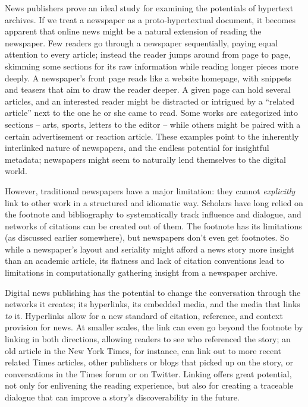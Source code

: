 News publishers prove an ideal study for examining the potentials of hypertext archives. If we treat a newspaper as a proto-hypertextual document, it becomes apparent that online news might be a natural extension of reading the newspaper. Few readers go through a newspaper sequentially, paying equal attention to every article; instead the reader jumps around from page to page, skimming some sections for its raw information while reading longer pieces more deeply. A newspaper's front page reads like a website homepage, with snippets and teasers that aim to draw the reader deeper. A given page can hold several articles, and an interested reader might be distracted or intrigued by a ``related article'' next to the one he or she came to read. Some works are categorized into sections -- arts, sports, letters to the editor -- while others might be paired with a certain advertisement or reaction article. These examples point to the inherently interlinked nature of newspapers, and the endless potential for insightful metadata; newspapers might seem to naturally lend themselves to the digital world.

However, traditional newspapers have a major limitation: they cannot \emph{explicitly} link to other work in a structured and idiomatic way. Scholars have long relied on the footnote and bibliography to systematically track influence and dialogue, and networks of citations can be created out of them. The footnote has its limitations (as discussed earlier somewhere), %
but newspapers don't even get footnotes. So while a newspaper's layout and seriality might afford a news story more insight than an academic article, its flatness and lack of citation conventions lead to limitations in computationally gathering insight from a newspaper archive.

Digital news publishing has the potential to change the conversation through the networks it creates; its hyperlinks, its embedded media, and the media that links \emph{to} it. Hyperlinks allow for a new standard of citation, reference, and context provision for news. At smaller scales, the link can even go beyond the footnote by linking in both directions, allowing readers to see who referenced the story; an old article in the New York Times, for instance, can link out to more recent related Times articles, other publishers or blogs that picked up on the story, or conversations in the Times forum or on Twitter. Linking offers great potential, not only for enlivening the reading experience, but also for creating a traceable dialogue that can improve a story's discoverability in the future.

